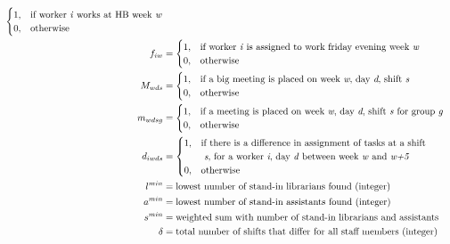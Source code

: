 \begin{align}
\begin{cases}
 		1, & \text{if worker \textit{i} works at HB week \textit{w}} \\
 		0, & \text{otherwise}
	\end{cases}
	\\
	f_{iw}&=
	\begin{cases}
 		1, & \text{if worker \textit{i} is assigned to work friday evening week \textit{w}} \\
 		0, & \text{otherwise}
	\end{cases}	
	\\
	M_{wds}&=
	\begin{cases}
	 	1, & \text{if a big meeting is placed on week \textit{w}, day \textit{d}, shift \textit{s}} \\
	 	0, & \text{otherwise}
	\end{cases}
	\\
	m_{wdsg}&=
	\begin{cases}
	 	1, & \text{if a meeting is placed on week \textit{w}, day \textit{d}, shift \textit{s} for group \textit{g}} \\
	 	0, & \text{otherwise}
	\end{cases}
	\\
	d_{iwds}&=
	\begin{cases}
	 	1, & \text{if there is a difference in assignment of tasks at a shift}\\
	 		& \text{ \textit{s}, for a worker \textit{i}, day \textit{d} between week \textit{w} and \textit{w+5}} \\
	 	0, & \text{otherwise}
	\end{cases}
	\\
	l^{min}&= \text{lowest number of stand-in librarians found (integer)} \\
	a^{min}&= \text{lowest number of stand-in assistants found (integer)} \\
	s^{min}&= \text{weighted sum with number of stand-in librarians and assistants} \\
	\delta&= \text{total number of shifts that differ for all staff members (integer)}
\end{align}



